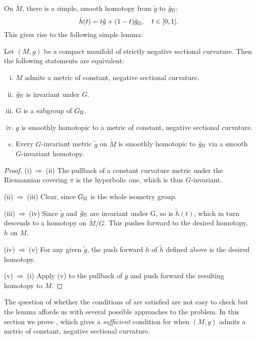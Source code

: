 \documentclass[a4paper,12pt]{amsart}
\begin{document}
On \(\tilde{M}\), there is a simple, smooth homotopy from \(\tilde{g}\) to \(\tilde{g}_{\mathbb{H}}\):
\[
\tilde{h}(t) = t\tilde{g} + (1-t)\tilde{g}_{\mathbb{H}}, \quad t \in [0, 1].
\]
This gives rise to the following simple lemma:

\begin{lemma}
\label{lem:const_neg}

Let \((M, g)\) be a compact manifold of strictly negative sectional curvature. Then the following statements are equivalent:
\begin{enumerate}[(i)]
\item \label{enum:neg_met} \(M\) admits a metric of constant, negative sectional curvature.
\item \label{enum:deck_met} \(\tilde{g}_{\mathbb{H}}\) is invariant under \(G\).
\item \label{enum:subgroup} G is a subgroup of \(G_{\mathbb{H}}\).
\item \label{enum:homo_met} \(g\) is smoothly homotopic to a metric of constant, negative sectional curvature.
\item \label{enum:homo_deck} Every \(G\)-invariant metric \(\tilde{g}\) on \(\tilde{M}\) is smoothly homotopic to \(\tilde{g}_{\mathbb{H}}\) via a smooth \(G\)-invariant homotopy.
\end{enumerate}
\end{lemma}

\begin{proof}
(i)\(\ \Rightarrow\ \)(ii) 
The pullback of a constant curvature metric under the Riemannian covering $\pi$ is the hyperbolic one, which is thus \(G\)-invariant.

(ii)\(\ \Rightarrow\ \)(iii)
Clear, since \(G_{\mathbb{H}}\) is the whole isometry group.

(iii)\(\ \Rightarrow\ \)(iv)
Since \(\tilde{g}\) and \(\tilde{g}_{\mathbb{H}}\) are invariant under G, so is \(\tilde{h}(t)\), which in turn descends to a homotopy on \(\tilde{M}/G\). This pushes forward to the desired homotopy, \(h\) on \(M\).

(iv)\(\ \Rightarrow\ \)(v)
For any given \(\tilde{g}\), the push forward \(h\) of \(\tilde{h}\) defined above is the desired homotopy.

(v)\(\ \Rightarrow\ \)(i)
Apply (v) to the pullback of \(g\) and push forward the resulting homotopy to \(M\).
\end{proof}

The question of whether the conditions of  are satisfied are not easy to check but the lemma affords us with several possible approaches to the problem. In this section we prove  , which gives a \emph{sufficient} condition for when \((M, g)\) admits a metric of constant, negative sectional curvature.
\end{document}
